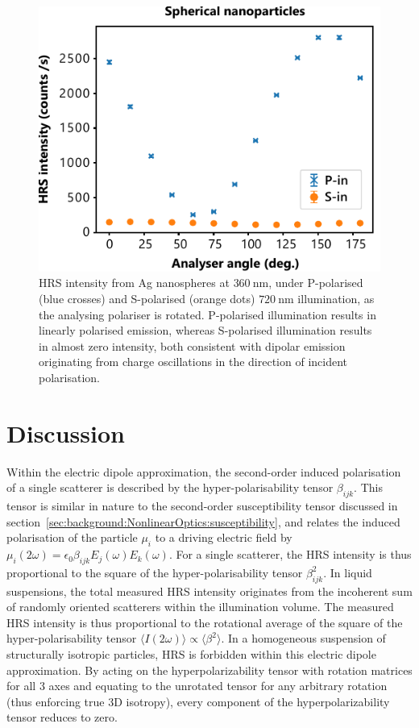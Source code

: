\begin{figure}[htb!]	
    \centering	
    \includegraphics[scale=1.0]{./figures/results/HRS/hrs_spheres.pdf}
    \caption{\label{fig:results:HRS:hrs_spheres}
    HRS intensity from Ag nanospheres at $\SI{360}{\nano\m}$, under P-polarised (blue crosses) and S-polarised (orange dots) $\SI{720}{\nano\m}$ illumination, as the analysing polariser is rotated. P-polarised illumination results in linearly polarised emission, whereas S-polarised illumination results in almost zero intensity, both consistent with dipolar emission originating from charge oscillations in the direction of incident polarisation.}	
\end{figure}

\section{Discussion}

Within the electric dipole approximation, the second-order induced polarisation of a single scatterer is described by the hyper-polarisability tensor $\beta_{ijk}$. This tensor is similar in nature to the second-order susceptibility tensor discussed in section~\ref{sec:background:NonlinearOptics:susceptibility}, and relates the induced polarisation of the particle $\mu_{i}$ to a driving electric field by $\mu_{i}(2\omega) =  \epsilon_{0} \beta_{ijk} E_{j}(\omega) E_{k}(\omega)$. For a single scatterer, the HRS intensity is thus proportional to the square of the hyper-polarisability tensor $\beta_{ijk}^2$. In liquid suspensions, the total measured HRS intensity originates from the incoherent sum of randomly oriented scatterers within the illumination volume.
The measured HRS intensity is thus proportional to the rotational average of the square of the hyper-polarisability tensor $\langle I(2\omega) \rangle \propto \langle \beta^{2} \rangle$.
In a homogeneous suspension of structurally isotropic particles, HRS is forbidden within this electric dipole approximation. By acting on the hyperpolarizability tensor with rotation matrices for all 3 axes and equating to the unrotated tensor for any arbitrary rotation (thus enforcing true 3D isotropy), every component of the hyperpolarizability tensor reduces to zero.

